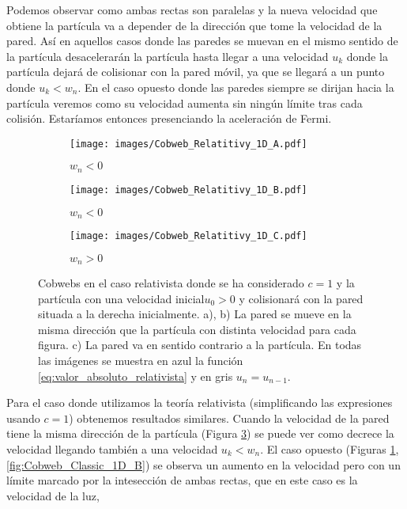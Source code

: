 \documentclass[11pt, spanish]{book}
\begin{document}
Podemos observar como ambas rectas son paralelas y la nueva velocidad que obtiene la partícula va a depender de la dirección que tome la velocidad de la pared. Así en aquellos casos donde las paredes se muevan en el mismo sentido de la partícula desacelerarán la partícula hasta llegar a una velocidad \( u_k \) donde la partícula dejará de colisionar con la pared móvil, ya que se llegará a un punto donde \( u_k < w_n \). En el caso opuesto donde las paredes siempre se dirijan hacia la partícula veremos como su velocidad aumenta sin ningún límite tras cada colisión. Estaríamos entonces presenciando la aceleración de Fermi.

\vspace{3mm}

\begin{figure}[H]
    \centering
    \begin{subfigure}[b]{0.3\textwidth}
        \centering
        \texttt{[image: images/Cobweb\_Relatitivy\_1D\_A.pdf]}
        \caption{$w_n<0$}
        \label{fig:Cobweb_Rel_1D_A}
    \end{subfigure}
    \hfill
    \begin{subfigure}[b]{0.3\textwidth}
        \centering
        \texttt{[image: images/Cobweb\_Relatitivy\_1D\_B.pdf]}
        \caption{$w_n<0$}
        \label{fig:Cobweb_Rel_1D_B}
    \end{subfigure}
    \hfill
    \begin{subfigure}[b]{0.3\textwidth}
        \centering
        \texttt{[image: images/Cobweb\_Relatitivy\_1D\_C.pdf]}
        \caption{$w_n>0$}
        \label{fig:Cobweb_Rel_1D_C}
    \end{subfigure}
    \caption{Cobwebs en el caso relativista donde se ha considerado \( c=1 \) y la partícula  con una velocidad inicial$u_0 > 0$ y colisionará con la pared situada a la derecha inicialmente. a), b) La pared se mueve en la misma dirección que la partícula con distinta velocidad para cada figura. c) La pared va en sentido contrario a la partícula. En todas las imágenes se muestra en azul la función \ref{eq:valor_absoluto_relativista} y en gris \( u_n = u_{n-1} \).}
        \label{fig:Cobweb_Classic_1D}
\end{figure}

Para el caso donde utilizamos la teoría relativista (simplificando las expresiones usando \( c = 1\)) obtenemos resultados similares. Cuando la velocidad de la pared tiene la misma dirección de la partícula (Figura \ref{fig:Cobweb_Rel_1D_C}) se puede ver como decrece la velocidad llegando también a una velocidad \( u_k < w_n \). El caso opuesto (Figuras \ref{fig:Cobweb_Rel_1D_A}, \ref{fig:Cobweb_Classic_1D_B}) se observa un aumento en la velocidad pero con un límite marcado por la intesección de ambas rectas, que en este caso es la velocidad de la luz,
\end{document}
